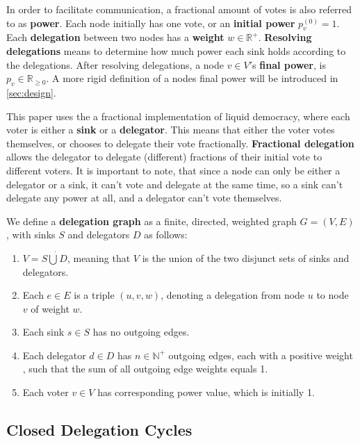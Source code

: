 In order to facilitate communication, a fractional amount of votes is also referred to as \textbf{power}. Each node initially has one vote, or an \textbf{initial power} $p^{(0)}_v = 1$. Each \textbf{delegation} between two nodes has a \textbf{weight} $w \in \mathbb{R}^+$.  \textbf{Resolving delegations} means to determine how much power each sink holds according to the delegations. After resolving delegations, a node $v \in V'$s \textbf{final power}, is $p_v \in \mathbb{R}_{\ge0}$. A more rigid definition of a nodes final power will be introduced in \cref{sec:design}.

This paper uses the a fractional implementation of liquid democracy, where each voter is either a \textbf{sink} or a \textbf{delegator}. This means that either the voter votes themselves, or chooses to delegate their vote fractionally. \textbf{Fractional delegation} allows the delegator to delegate (different) fractions of their initial vote to different voters. It is important to note, that since a node can only be either a delegator or a sink, it can't vote and delegate at the same time, so a sink can't delegate any power at all, and a delegator can't vote themselves. 
 
We define a \textbf{delegation graph} as a finite, directed, weighted graph $G = (V, E)$, with sinks $S$ and delegators $D$ as follows:

\begin{enumerate}
\item $V = S \dot\bigcup D$, meaning that $V$ is the union of the two disjunct sets of sinks and delegators.
\item Each $e \in E$ is a triple $(u, v, w)$, denoting a delegation from node $u$ to node $v$ of weight $w$.
\item Each sink $s \in S$ has no outgoing edges.
\item Each delegator $d \in D$ has $n \in \mathbb{N}^+$ outgoing edges, each with a positive weight \footnotemark, such that the sum of all outgoing edge weights equals 1.
\item Each voter $v \in V$ has corresponding power value, which is initially 1.
\end{enumerate}

\subsection{Closed Delegation Cycles}


